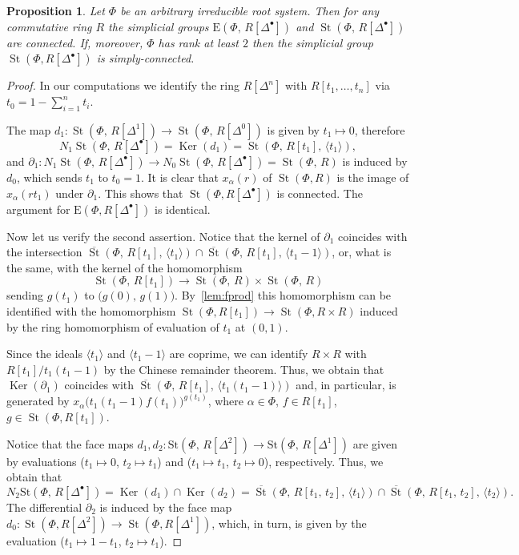 \documentclass[oneside, 11pt]{amsart} \pdfoutput=1
\newcommand{\Ker}{\mathop{\mathrm{Ker}}\nolimits}
\newcommand{\St}{\mathop{\mathrm{St}}\nolimits}
\newcommand{\E}{\mathrm{E}}
\numberwithin{equation}{section}
\newtheorem{prop}[lemma]{Proposition}
\theoremstyle{definition}
\begin{document}
\begin{prop}\label{prop:pi1-StDelta} Let $\Phi$ be an arbitrary irreducible root system. Then for any commutative ring $R$ the simplicial groups $\E(\Phi,\,R[\Delta^\bullet])$ and $\St(\Phi,\,R[\Delta^\bullet])$ are connected. If, moreover, $\Phi$ has rank at least $2$ then the simplicial group $\St(\Phi, R[\Delta^\bullet])$ is simply-connected. \end{prop}
\begin{proof}
In our computations we identify the ring $R[\Delta^n]$ with $R[t_1, \ldots, t_n]$ via $t_0 = 1 - \sum_{i=1}^n t_i$. 

The map $d_1\colon\St(\Phi,\,R[\Delta^1])\rightarrow\St(\Phi,\,R[\Delta^0])$ is given by $t_1\mapsto0$, therefore \[N_1\St(\Phi,\,R[\Delta^\bullet])=\Ker(d_1)=\St(\Phi,\,R[t_1],\,\langle t_1\rangle),\]
and $\partial_1\colon N_1\St(\Phi,\,R[\Delta^\bullet])\rightarrow N_0\St(\Phi,\,R[\Delta^\bullet])=\St(\Phi,\,R)$ is induced by $d_0$, which sends $t_1$ to $t_0=1$. 
It is clear that $x_\alpha(r)$ of $\St(\Phi, R)$ is the image of $x_\alpha(rt_1)$ under $\partial_1$.
This shows that $\St(\Phi, R[\Delta^\bullet])$ is connected. The argument for $\mathrm{E}(\Phi, R[\Delta^\bullet])$ is identical.

Now let us verify the second assertion. Notice that the kernel of $\partial_1$ coincides with the intersection $\overline{\St}(\Phi,\,R[t_1],\,\langle t_1\rangle)\cap\overline{\St}(\Phi,\,R[t_1],\,\langle t_1-1 \rangle )$, or, what is the same, with the kernel of the homomorphism
\[\St(\Phi,\,R[t_1])\rightarrow\St(\Phi,\,R)\times\St(\Phi,\,R)\]
sending $g(t_1)$ to $\big(g(0),\,g(1)\big)$. By~\cref{lem:fprod} this homomorphism can be identified with the homomorphism $\St(\Phi, R[t_1]) \to \St(\Phi, R\times R)$ induced by the ring homomorphism of evaluation of $t_1$ at $(0, 1)$.

Since the ideals $\langle t_1 \rangle$ and $\langle t_1-1 \rangle$ are coprime, we can identify $R\times R$ with $R[t_1]/t_1(t_1-1)$ by the Chinese remainder theorem. Thus, we obtain that $\Ker(\partial_1)$ coincides with $\overline{\St}(\Phi,\,R[t_1],\,\langle t_1(t_1-1) \rangle)$ and, in particular, is generated by $x_\alpha\big(t_1(t_1-1)f(t_1)\big)^{g(t_1)}$, where $\alpha \in \Phi$, $f\in R[t_1]$, $g \in \St(\Phi, R[t_1])$.

Notice that the face maps $d_1, d_2\colon\mathrm{St}(\Phi,\,R[\Delta^2])\rightarrow\mathrm{St}(\Phi,\,R[\Delta^1])$ are given by evaluations ($t_1\mapsto0$, $t_2\mapsto t_1$) and ($t_1\mapsto t_1$, $t_2\mapsto0$), respectively. Thus, we obtain that \[N_2\mathrm{St}(\Phi,\,R[\Delta^\bullet])=\Ker(d_1)\cap\Ker(d_2)=\overline{\St}(\Phi,\,R[t_1,\,t_2],\,\langle t_1\rangle )\cap\overline{\St}(\Phi,\,R[t_1,\,t_2],\,\langle t_2\rangle).\]
The differential $\partial_2$ is induced by the face map $d_0 \colon \St(\Phi, R[\Delta^2]) \to \St(\Phi, R[\Delta^1])$, which, in turn, is given by the evaluation ($t_1 \mapsto 1-t_1$, $t_2 \mapsto t_1$). 


\end{proof}
\end{document}
